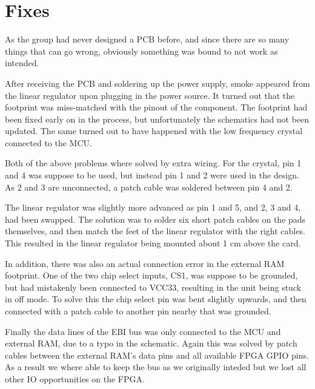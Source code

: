 
\section{Fixes}

As the group had never designed a PCB before, and since there
are so many things that can go wrong, obviously something was
bound to not work as intended.

After receiving the PCB and soldering up the power supply, smoke
appeared from the linear regulator upon plugging in the power
source. It turned out that the footprint was miss-matched with
the pinout of the component. The footprint had been fixed early
on in the process, but unfortunately the schematics had not been
updated. The same turned out to have happened with the low
frequency crystal connected to the MCU.

Both of the above problems where solved by extra wiring. For the
crystal, pin 1 and 4 was suppose to be used, but instead pin 1
and 2 were used in the design. As 2 and 3 are unconnected, a
patch cable was soldered between pin 4 and 2.

The linear regulator was slightly more advanced as pin 1 and 5,
and 2, 3 and 4, had been swapped. The solution was to solder six
short patch cables on the pads themselves, and then match the
feet of the linear regulator with the right cables. This
resulted in the linear regulator being mounted about 1 cm above
the card. 

In addition, there was also an actual connection error in the
external RAM footprint. One of the two chip select inputs, CS1, was
suppose to be grounded, but had mistakenly been connected to
VCC33, resulting in the unit being stuck in off mode. To solve
this the chip select pin was bent slightly upwards, and then
connected with a patch cable to another pin nearby that was
grounded. 

Finally the data lines of the EBI bus was only connected to the
MCU and external RAM, due to a typo in the schematic. Again this
was solved by patch cables between the external RAM's data pins
and all available FPGA GPIO pins. As a result we where able to 
keep the bus as we originally inteded  but we lost all other IO 
opportunities on the FPGA. 
